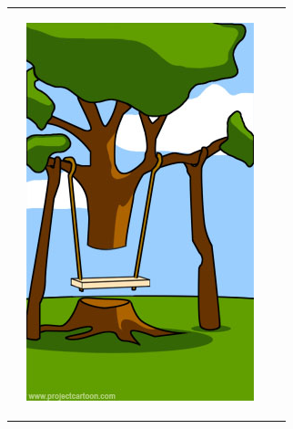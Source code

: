 \begin{tabularx}{\textwidth}{XXXX}
\begin{minipage}[t]{0.23\textwidth}
\begin{center}
\vspace*{3mm}
\end{center}
\end{minipage}
&
\begin{minipage}[t]{0.23\textwidth}
\begin{center}
\includegraphics[width=1.0\textwidth]{./inf/SEKII/29_Softwaretechnik/PM_03.jpg}


\end{center}
\end{minipage}
\end{tabularx}

